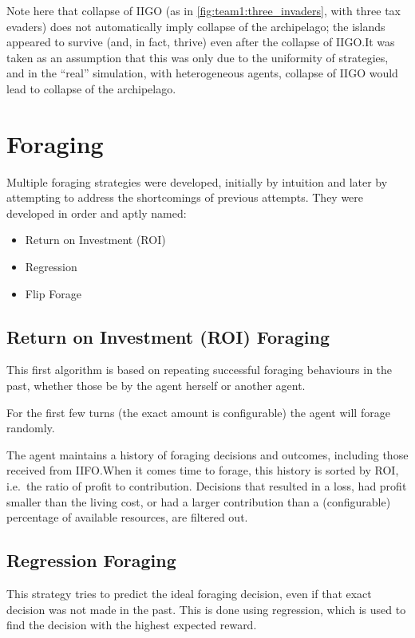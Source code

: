 Note here that collapse of IIGO (as in \autoref{fig:team1:three_invaders}, with three tax evaders) does not automatically imply collapse of the archipelago; the islands appeared to survive (and, in fact, thrive) even after the collapse of IIGO.\@ It was taken as an assumption that this was only due to the uniformity of strategies, and in the ``real'' simulation, with heterogeneous agents, collapse of IIGO would lead to collapse of the archipelago.



\section{Foraging}
Multiple foraging strategies were developed, initially by intuition and later by attempting to address the shortcomings of previous attempts. They were developed in order and aptly named:
\begin{itemize}
    \item Return on Investment (ROI)
    \item Regression
    \item Flip Forage
\end{itemize}


\subsection{Return on Investment (ROI) Foraging}%
\label{sec:forage-roi}

This first algorithm is based on repeating successful foraging behaviours in the past, whether those be by the agent herself or another agent.

For the first few turns (the exact amount is configurable) the agent will forage randomly.

The agent maintains a history of foraging decisions and outcomes, including those received from IIFO.\@ When it comes time to forage, this history is sorted by ROI, i.e.\ the ratio of profit to contribution. Decisions that resulted in a loss, had profit smaller than the living cost, or had a larger contribution than a (configurable) percentage of available resources, are filtered out.

\subsection{Regression Foraging}%
\label{sec:forage-regression}

This strategy tries to predict the ideal foraging decision, even if that exact decision was not made in the past. This is done using regression, which is used to find the decision with the highest expected reward.


